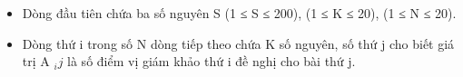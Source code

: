 \begin{itemize}
	\item Dòng đầu tiên chứa ba số nguyên S (1 ≤ S ≤ 200), (1 ≤ K ≤ 20), (1 ≤ N ≤ 20).
	\item Dòng thứ i trong số N dòng tiếp theo chứa K số nguyên, số thứ j cho biết giá trị A $_ ij $ là số điểm vị giám khảo thứ i đề nghị cho bài thứ j.
\end{itemize}